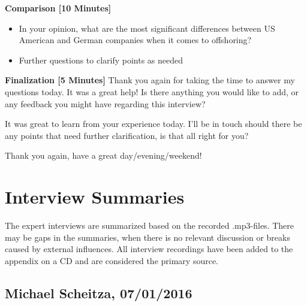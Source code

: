 \begin{appendix}
\newpage
{\bf Comparison [10 Minutes]}
\begin{itemize}
	\item In your opinion, what are the most significant differences between US American and German companies when it comes to offshoring?
	\item Further questions to clarify points as needed
\end{itemize}

{\bf Finalization [5 Minutes]}
Thank you again for taking the time to answer my questions today. It was a great help! Is there anything you would like to add, or any feedback you might have regarding this interview?

It was great to learn from your experience today. I’ll be in touch should there be any points that need further clarification, is that all right for you?

Thank you again, have a great day/evening/weekend!


\tocless\section{Interview Summaries}
The expert interviews are summarized based on the recorded .mp3-files. There may be gaps in the summaries, when there is no relevant discussion or breaks caused by external influences. All interview recordings have been added to the appendix on a CD and are considered the primary source.

\tocless\subsection{Michael Scheitza, 07/01/2016}
\label{int:Scheitza}


\end{appendix}
